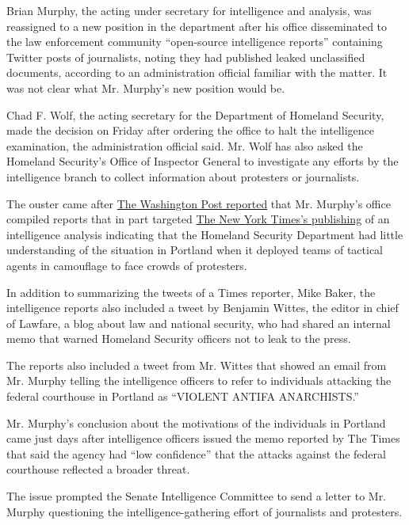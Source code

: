 Brian Murphy, the acting under secretary for intelligence and analysis,
was reassigned to a new position in the department after his office
disseminated to the law enforcement community ``open-source intelligence
reports'' containing Twitter posts of journalists, noting they had
published leaked unclassified documents, according to an administration
official familiar with the matter. It was not clear what Mr. Murphy's
new position would be.

Chad F. Wolf, the acting secretary for the Department of Homeland
Security, made the decision on Friday after ordering the office to halt
the intelligence examination, the administration official said. Mr. Wolf
has also asked the Homeland Security's Office of Inspector General to
investigate any efforts by the intelligence branch to collect
information about protesters or journalists.

The ouster came after
\href{https://www.washingtonpost.com/national-security/dhs-compiled-intelligence-reports-on-journalists-who-published-leaked-documents/2020/07/30/5be5ec9e-d25b-11ea-9038-af089b63ac21_story.html}{The
Washington Post reported} that Mr. Murphy's office compiled reports that
in part targeted
\href{https://www.nytimes3xbfgragh.onion/2020/07/28/us/federal-agents-portland-seattle-protests.html}{The
New York Times's publishing} of an intelligence analysis indicating that
the Homeland Security Department had little understanding of the
situation in Portland when it deployed teams of tactical agents in
camouflage to face crowds of protesters.

In addition to summarizing the tweets of a Times reporter, Mike Baker,
the intelligence reports also included a tweet by Benjamin Wittes, the
editor in chief of Lawfare, a blog about law and national security, who
had shared an internal memo that warned Homeland Security officers not
to leak to the press.

The reports also included a tweet from Mr. Wittes that showed an email
from Mr. Murphy telling the intelligence officers to refer to
individuals attacking the federal courthouse in Portland as ``VIOLENT
ANTIFA ANARCHISTS.''

Mr. Murphy's conclusion about the motivations of the individuals in
Portland came just days after intelligence officers issued the memo
reported by The Times that said the agency had ``low confidence'' that
the attacks against the federal courthouse reflected a broader threat.

The issue prompted the Senate Intelligence Committee to send a letter to
Mr. Murphy questioning the intelligence-gathering effort of journalists
and protesters.

